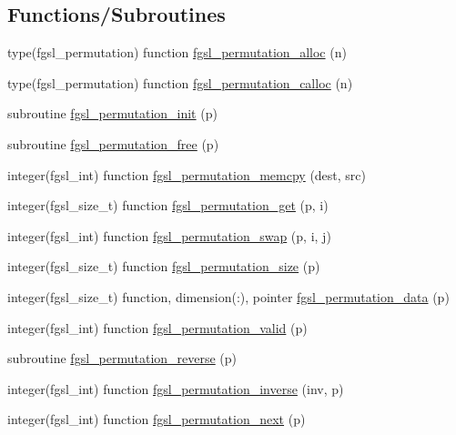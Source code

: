 \subsection*{Functions/\+Subroutines}
\begin{DoxyCompactItemize}
\item 
type(fgsl\+\_\+permutation) function \hyperlink{permutation_8finc_ada94635d088a532e6e74096b2dc431b0}{fgsl\+\_\+permutation\+\_\+alloc} (n)
\item 
type(fgsl\+\_\+permutation) function \hyperlink{permutation_8finc_a204b9ecb1475f3681277d149399f49c6}{fgsl\+\_\+permutation\+\_\+calloc} (n)
\item 
subroutine \hyperlink{permutation_8finc_ad59ced94489b46930f05e4e01e0fd91a}{fgsl\+\_\+permutation\+\_\+init} (p)
\item 
subroutine \hyperlink{permutation_8finc_a2cc1fdc81859de1228dfcaf62d03e610}{fgsl\+\_\+permutation\+\_\+free} (p)
\item 
integer(fgsl\+\_\+int) function \hyperlink{permutation_8finc_adf9b7a7b269e0d3679d687c82c2ee69a}{fgsl\+\_\+permutation\+\_\+memcpy} (dest, src)
\item 
integer(fgsl\+\_\+size\+\_\+t) function \hyperlink{permutation_8finc_a5bcaae948bb703b674973a966408e964}{fgsl\+\_\+permutation\+\_\+get} (p, i)
\item 
integer(fgsl\+\_\+int) function \hyperlink{permutation_8finc_a937965d21974947b8027697decfbdf2a}{fgsl\+\_\+permutation\+\_\+swap} (p, i, j)
\item 
integer(fgsl\+\_\+size\+\_\+t) function \hyperlink{permutation_8finc_a89bad660423aef5e3a8f59b93e3c3f7f}{fgsl\+\_\+permutation\+\_\+size} (p)
\item 
integer(fgsl\+\_\+size\+\_\+t) function, dimension(\+:), pointer \hyperlink{permutation_8finc_a2d8ed5cdeac5c7eb952d34f5c84b70b4}{fgsl\+\_\+permutation\+\_\+data} (p)
\item 
integer(fgsl\+\_\+int) function \hyperlink{permutation_8finc_afdb5b335edee506c4c5edf402c24de2e}{fgsl\+\_\+permutation\+\_\+valid} (p)
\item 
subroutine \hyperlink{permutation_8finc_aba5046d4e21611729ce03009b869d4db}{fgsl\+\_\+permutation\+\_\+reverse} (p)
\item 
integer(fgsl\+\_\+int) function \hyperlink{permutation_8finc_a70977eec8133e0d4159857f6ff86a80d}{fgsl\+\_\+permutation\+\_\+inverse} (inv, p)
\item 
integer(fgsl\+\_\+int) function \hyperlink{permutation_8finc_a67f05c2a45fe4df0f97618debdb10e11}{fgsl\+\_\+permutation\+\_\+next} (p)

\end{DoxyCompactItemize}
